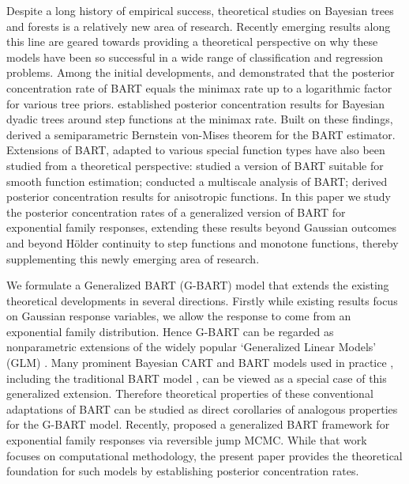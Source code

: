 \documentclass[12pt]{article}
\newcommand{\1}{\mathbb{I}}
\theoremstyle{plain}
\theoremstyle{definition}
\theoremstyle{remark}
\begin{document}
Despite a long history of empirical success, theoretical studies on Bayesian trees and forests is a relatively new area of research. Recently emerging results along this line are geared towards providing a theoretical perspective on why these models have been so successful in a wide range of classification and regression problems. Among the initial developments, \cite{rockova2019theory} and \cite{rockova2020posterior} demonstrated that the posterior concentration rate of BART equals the minimax rate up to a logarithmic factor for various tree priors. \cite{van2017bayesian} established posterior concentration results for Bayesian dyadic trees around step functions at the minimax rate. Built on these findings, \cite{rockova2020semi} derived a semiparametric Bernstein von-Mises theorem for the BART estimator. Extensions of BART, adapted to various special function types have also been studied from a theoretical perspective: \cite{linero2017bayesian} studied a version of BART suitable for smooth function estimation; \cite{castillo2019multiscale} conducted a multiscale analysis of BART; \cite{jeong2020art} derived posterior concentration results for anisotropic functions. In this paper we study the posterior concentration rates of a generalized version of BART for exponential family responses, extending these results beyond Gaussian outcomes and beyond Hölder continuity to step functions and monotone functions, thereby supplementing this newly emerging area of research.

We formulate a Generalized BART (G-BART) model that extends the existing theoretical developments in several directions. Firstly while existing results focus on Gaussian response variables, we allow the response to come from an exponential family distribution. Hence G-BART can be regarded as nonparametric extensions of the widely popular `Generalized Linear Models' (GLM) \citep{nelder1972generalized}. Many prominent Bayesian CART and BART models used in practice \citep{denison1998bayesian, chipman2010bart, murray2017log}, including the traditional BART model \citep{chipman2010bart}, can be viewed as a special case of this generalized extension. Therefore theoretical properties of these conventional adaptations of BART can be studied as direct corollaries of analogous properties for the G-BART model. Recently, \cite{linero2025generalized} proposed a generalized BART framework for exponential family responses via reversible jump MCMC. While that work focuses on computational methodology, the present paper provides the theoretical foundation for such models by establishing posterior concentration rates.
\end{document}
